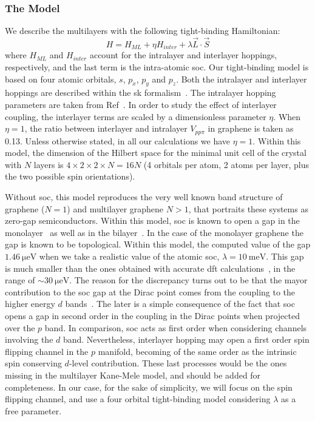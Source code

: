 \subsubsection{The Model}
We describe the multilayers with the following tight-binding Hamiltonian:
\begin{equation}
 H = H_{ML} + \eta H_{inter} + \lambda\vec{L}\cdot\vec{S}
\label{Hamil}
\end{equation}
where $H_{ML}$ and $H_{inter} $ account for the intralayer and interlayer  hoppings, respectively, and the last term is the intra-atomic \ac{soc}. Our tight-binding model is based on four atomic orbitals,  $s$, $p_{x}$, $p_{y}$ and $p_{z}$.
Both the intralayer and interlayer hoppings are described within the \acf{sk} formalism~\cite{Slater1954}. The intralayer hopping parameters are taken from Ref~\cite{Gosalbez-Martinez2011}. In order to study the effect of interlayer coupling, the interlayer terms are scaled by a dimensionless parameter $\eta$. When $\eta=1$, the ratio between interlayer and intralayer $V_{pp\pi}$ in graphene is taken as~\cite{Katsnelson2012} 0.13. Unless otherwise stated, in all our calculations we have $\eta=1$.
Within this model, the dimension of the Hilbert space for the minimal unit cell of the crystal with $N$ layers is $4\times2\times2\times N = 16N$ (4 orbitals per atom, 2 atoms per layer, plus the two possible spin orientations).

Without \ac{soc}, this model reproduces the very well known band structure of graphene ($N=1$) and multilayer graphene $N>1$, that portraits these systems as zero-gap semiconductors. Within this model, \ac{soc} is known to open a gap in the monolayer~\cite{Min2006}  as well as in the bilayer~\cite{Konschuh2012,Guinea2010,Cortijo2010}. In the case of the monolayer graphene the gap is known to be topological. Within this model, the computed value of the gap $\SI{1.46}{\micro\eV}$ when we take a realistic value of the atomic \ac{soc}, $\lambda=\SI{10}{\meV}$. This gap is much smaller than the ones obtained with accurate \ac{dft} calculations~\cite{Konschuh2011a}, in the range of $\sim\SI{30}{\micro\eV}$.
The reason for the discrepancy turns out to be that the mayor contribution to the \ac{soc} gap at the Dirac point comes from the coupling to the higher energy $d$ bands~\cite{Konschuh2012,Konschuh2011a}.
The later is a simple consequence of the fact that \ac{soc} opens a gap in second order in the coupling in the Dirac points when projected over the $p$ band. In comparison, \ac{soc} acts as first order when considering channels involving the $d$ band.
Nevertheless, interlayer hopping may open a first order spin flipping channel in the $p$ manifold, becoming of the same order as the intrinsic spin conserving $d$-level contribution.
These last processes would be the ones missing in the multilayer Kane-Mele model, and should be added for completeness.
In our case, for the sake of simplicity, we will focus on the spin flipping channel, and use a four orbital tight-binding model considering $\lambda$ as a free parameter.

